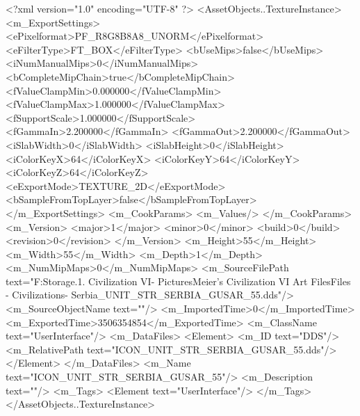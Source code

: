 <?xml version="1.0" encoding="UTF-8" ?>
<AssetObjects..TextureInstance>
	<m_ExportSettings>
		<ePixelformat>PF_R8G8B8A8_UNORM</ePixelformat>
		<eFilterType>FT_BOX</eFilterType>
		<bUseMips>false</bUseMips>
		<iNumManualMips>0</iNumManualMips>
		<bCompleteMipChain>true</bCompleteMipChain>
		<fValueClampMin>0.000000</fValueClampMin>
		<fValueClampMax>1.000000</fValueClampMax>
		<fSupportScale>1.000000</fSupportScale>
		<fGammaIn>2.200000</fGammaIn>
		<fGammaOut>2.200000</fGammaOut>
		<iSlabWidth>0</iSlabWidth>
		<iSlabHeight>0</iSlabHeight>
		<iColorKeyX>64</iColorKeyX>
		<iColorKeyY>64</iColorKeyY>
		<iColorKeyZ>64</iColorKeyZ>
		<eExportMode>TEXTURE_2D</eExportMode>
		<bSampleFromTopLayer>false</bSampleFromTopLayer>
	</m_ExportSettings>
	<m_CookParams>
		<m_Values/>
	</m_CookParams>
	<m_Version>
		<major>1</major>
		<minor>0</minor>
		<build>0</build>
		<revision>0</revision>
	</m_Version>
	<m_Height>55</m_Height>
	<m_Width>55</m_Width>
	<m_Depth>1</m_Depth>
	<m_NumMipMaps>0</m_NumMipMaps>
	<m_SourceFilePath text="F:\Mod Storage\2.1. Civilization VI\Mods\Archive - Pictures\Sid Meier's Civilization VI Art Files\Art Files - Civilizations\Civilization - Serbia\ICON_UNIT_STR_SERBIA_GUSAR_55.dds"/>
	<m_SourceObjectName text=""/>
	<m_ImportedTime>0</m_ImportedTime>
	<m_ExportedTime>3506354854</m_ExportedTime>
	<m_ClassName text="UserInterface"/>
	<m_DataFiles>
		<Element>
			<m_ID text="DDS"/>
			<m_RelativePath text="ICON_UNIT_STR_SERBIA_GUSAR_55.dds"/>
		</Element>
	</m_DataFiles>
	<m_Name text="ICON_UNIT_STR_SERBIA_GUSAR_55"/>
	<m_Description text=""/>
	<m_Tags>
		<Element text="UserInterface"/>
	</m_Tags>
</AssetObjects..TextureInstance>

